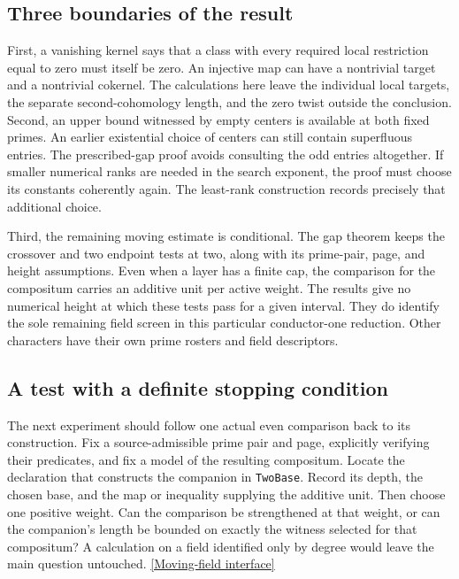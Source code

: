 \documentclass[12pt,letterpaper]{article}
\begin{document}
\subsection{Three boundaries of the result}

First, a vanishing kernel says that a class with every required local restriction equal to zero must itself be zero. An injective map can have a nontrivial target and a nontrivial cokernel. The calculations here leave the individual local targets, the separate second-cohomology length, and the zero twist outside the conclusion. Second, an upper bound witnessed by empty centers is available at both fixed primes. An earlier existential choice of centers can still contain superfluous entries. The prescribed-gap proof avoids consulting the odd entries altogether. If smaller numerical ranks are needed in the search exponent, the proof must choose its constants coherently again. The least-rank construction records precisely that additional choice.

Third, the remaining moving estimate is conditional. The gap theorem keeps the crossover and two endpoint tests at two, along with its prime-pair, page, and height assumptions. Even when a layer has a finite cap, the comparison for the compositum carries an additive unit per active weight. The results give no numerical height at which these tests pass for a given interval. They do identify the sole remaining field screen in this particular conductor-one reduction. Other characters have their own prime rosters and field descriptors.

\subsection{A test with a definite stopping condition}

The next experiment should follow one actual even comparison back to its construction. Fix a source-admissible prime pair and page, explicitly verifying their predicates, and fix a model of the resulting compositum. Locate the declaration that constructs the companion in \texttt{TwoBase}. Record its depth, the chosen base, and the map or inequality supplying the additive unit. Then choose one positive weight. Can the comparison be strengthened at that weight, or can the companion's length be bounded on exactly the witness selected for that compositum? A calculation on a field identified only by degree would leave the main question untouched.
\href{https://github.com/nousentllc/riemann-hypothesis/blob/40e56bab026552e089d7afcfeff08d2defb9c005/src/Development/AutomorphicArithmetic/AutomorphicVarieties/LayeredIsomorphisms/SecondBound.lean#L36-L44}{[Moving-field interface]}
\end{document}

